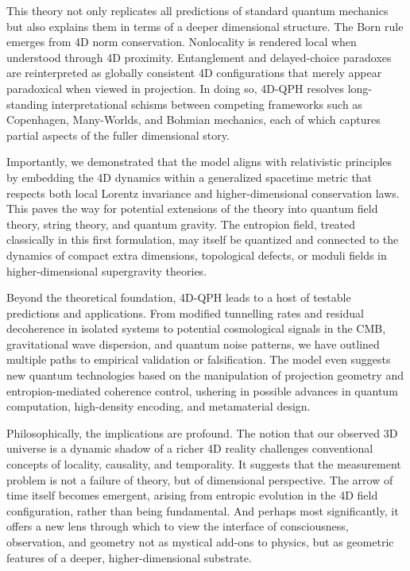\documentclass[12pt]{article}
\begin{document}
This theory not only replicates all predictions of standard quantum mechanics but also explains them in terms of a deeper dimensional structure. The Born rule emerges from 4D norm conservation. Nonlocality is rendered local when understood through 4D proximity. Entanglement and delayed-choice paradoxes are reinterpreted as globally consistent 4D configurations that merely appear paradoxical when viewed in projection. In doing so, 4D-QPH resolves long-standing interpretational schisms between competing frameworks such as Copenhagen, Many-Worlds, and Bohmian mechanics, each of which captures partial aspects of the fuller dimensional story.

Importantly, we demonstrated that the model aligns with relativistic principles by embedding the 4D dynamics within a generalized spacetime metric that respects both local Lorentz invariance and higher-dimensional conservation laws. This paves the way for potential extensions of the theory into quantum field theory, string theory, and quantum gravity. The entropion field, treated classically in this first formulation, may itself be quantized and connected to the dynamics of compact extra dimensions, topological defects, or moduli fields in higher-dimensional supergravity theories.

Beyond the theoretical foundation, 4D-QPH leads to a host of testable predictions and applications. From modified tunnelling rates and residual decoherence in isolated systems to potential cosmological signals in the CMB, gravitational wave dispersion, and quantum noise patterns, we have outlined multiple paths to empirical validation or falsification. The model even suggests new quantum technologies based on the manipulation of projection geometry and entropion-mediated coherence control, ushering in possible advances in quantum computation, high-density encoding, and metamaterial design.

Philosophically, the implications are profound. The notion that our observed 3D universe is a dynamic shadow of a richer 4D reality challenges conventional concepts of locality, causality, and temporality. It suggests that the measurement problem is not a failure of theory, but of dimensional perspective. The arrow of time itself becomes emergent, arising from entropic evolution in the 4D field configuration, rather than being fundamental. And perhaps most significantly, it offers a new lens through which to view the interface of consciousness, observation, and geometry not as mystical add-ons to physics, but as geometric features of a deeper, higher-dimensional substrate.
\end{document}
